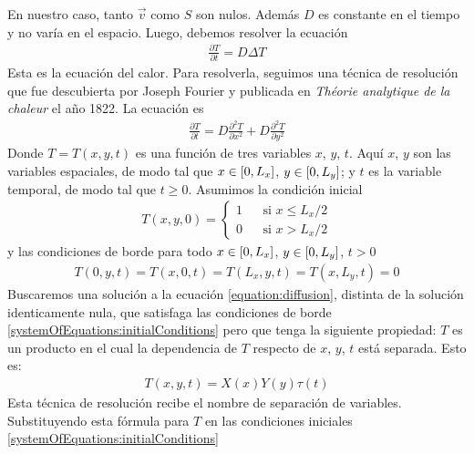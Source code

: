 \documentclass{article}
\newcommand{\leftOpenInterval}{\left]}
\newcommand{\rightOpenInterval}{\right[}
\newcommand{\leftClosedInterval}{\left[}
\newcommand{\rightClosedInterval}{\right]}
\newcommand{\interval}[3]{%
  \ifstrequal{#1}{oo}{%
    \leftOpenInterval #2, #3 \rightOpenInterval%
  }{%
    \ifstrequal{#1}{co}{%
      \leftClosedInterval #2, #3 \rightOpenInterval%
    }{%
      \ifstrequal{#1}{oc}{
        \leftOpenInterval #2, #3 \rightClosedInterval%
      }{%
        \ifstrequal{#1}{cc}{
          \leftClosedInterval #2, #3 \rightClosedInterval
        }{%
        }%
      }%
    }%
  }%
}
\begin{document}
    En nuestro caso, tanto \(\vec{v}\) como \(S\) son nulos.
    Además \(D\) es constante en el tiempo y no varía en el espacio.
    Luego, debemos resolver la ecuación
    \begin{align}
      \frac{\partial T}{\partial t} = D \Delta T
    \end{align}
    Esta es la ecuación del calor.
    Para resolverla, seguimos una técnica de resolución que fue descubierta por Joseph Fourier y publicada en \emph{Théorie analytique de la chaleur} el año 1822.
    La ecuación es
    \begin{align}
      \label{equation:diffusion}
      \frac{\partial T}{\partial t}
      =
      D \frac{\partial^2 T}{\partial x^2} + D \frac{\partial^2 T}{\partial y^2}
    \end{align}
    Donde \(T = T(x, y, t)\) es una función de tres variables \(x\), \(y\), \(t\).
    Aquí \(x\), \(y\) son las variables espaciales, de modo tal que \(x \in \interval{cc}{0}{L_x}\), \(y \in \interval{cc}{0}{L_y}\);
    y \(t\) es la variable temporal, de modo tal que \(t \geq 0\).
    Asumimos la condición inicial
    \begin{align}
      \label{equation:initialCondition}
      T(x, y, 0)
      =
      \left\{
        \begin{aligned}
          1 &&\text{si } x \leq L_x /2 \\
          0 &&\text{si } x > L_x / 2
        \end{aligned}
      \right.
    \end{align}
    y las condiciones de borde para todo \(x \in \interval{cc}{0}{L_x}\), \(y \in \interval{cc}{0}{L_y}\), \(t > 0\)
    \begin{align}
      \label{systemOfEquations:initialConditions}
      T(0, y , t)
      =
      T(x, 0, t)
      =
      T(L_x, y, t)
      =
      T(x, L_y, t)
      =
      0
    \end{align}
    Buscaremos una solución a la ecuación \eqref{equation:diffusion}, distinta de la solución identicamente nula, que satisfaga las condiciones de borde \eqref{systemOfEquations:initialConditions} pero que tenga la siguiente propiedad:
    \(T\) es un producto en el cual la dependencia de \(T\) respecto de \(x\), \(y\), \(t\) está separada.
    Esto es:
    \begin{align}
      T(x, y, t)
      =
      X(x) Y(y) \tau(t)
    \end{align}
    Esta técnica de resolución recibe el nombre de separación de variables.
    Substituyendo esta fórmula para \(T\) en las condiciones iniciales \eqref{systemOfEquations:initialConditions}
\end{document}
